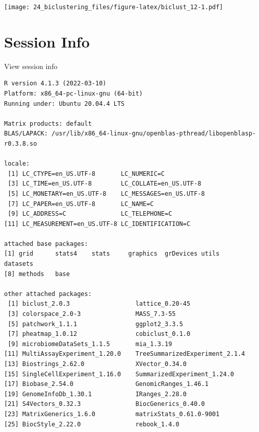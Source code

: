 \documentclass[
]{book}
\begin{document}
\texttt{[image: 24\_biclustering\_files/figure-latex/biclust\_12-1.pdf]}

\hypertarget{session-info-7}{%
\section*{Session Info}\label{session-info-7}}

View session info

\begin{verbatim}
R version 4.1.3 (2022-03-10)
Platform: x86_64-pc-linux-gnu (64-bit)
Running under: Ubuntu 20.04.4 LTS

Matrix products: default
BLAS/LAPACK: /usr/lib/x86_64-linux-gnu/openblas-pthread/libopenblasp-r0.3.8.so

locale:
 [1] LC_CTYPE=en_US.UTF-8       LC_NUMERIC=C              
 [3] LC_TIME=en_US.UTF-8        LC_COLLATE=en_US.UTF-8    
 [5] LC_MONETARY=en_US.UTF-8    LC_MESSAGES=en_US.UTF-8   
 [7] LC_PAPER=en_US.UTF-8       LC_NAME=C                 
 [9] LC_ADDRESS=C               LC_TELEPHONE=C            
[11] LC_MEASUREMENT=en_US.UTF-8 LC_IDENTIFICATION=C       

attached base packages:
[1] grid      stats4    stats     graphics  grDevices utils     datasets 
[8] methods   base     

other attached packages:
 [1] biclust_2.0.3                  lattice_0.20-45               
 [3] colorspace_2.0-3               MASS_7.3-55                   
 [5] patchwork_1.1.1                ggplot2_3.3.5                 
 [7] pheatmap_1.0.12                cobiclust_0.1.0               
 [9] microbiomeDataSets_1.1.5       mia_1.3.19                    
[11] MultiAssayExperiment_1.20.0    TreeSummarizedExperiment_2.1.4
[13] Biostrings_2.62.0              XVector_0.34.0                
[15] SingleCellExperiment_1.16.0    SummarizedExperiment_1.24.0   
[17] Biobase_2.54.0                 GenomicRanges_1.46.1          
[19] GenomeInfoDb_1.30.1            IRanges_2.28.0                
[21] S4Vectors_0.32.3               BiocGenerics_0.40.0           
[23] MatrixGenerics_1.6.0           matrixStats_0.61.0-9001       
[25] BiocStyle_2.22.0               rebook_1.4.0                  


\end{verbatim}
\end{document}
